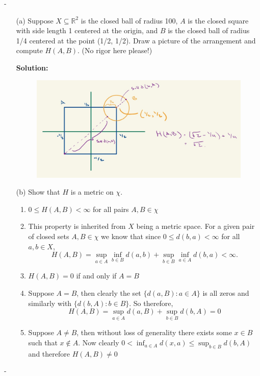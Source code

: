 \documentclass[12pt]{article}
\makeatletter
\theoremstyle{ex215}
\newcounter{probcount}
\newlength\probsep
\newlength\pshrinking
\newenvironment{problems}%
  {\ifhmode\unskip\par\fi\setcounter{probcount}{0}\probsep\parskip
  \sbox\@tempboxa{\textbf{9.}}\pshrinking\wd\@tempboxa\advance\pshrinking\labelsep
  \advance\linewidth -\pshrinking
  \advance\@totalleftmargin\pshrinking
  \advance\leftskip\pshrinking}%
  {\ifhmode\unskip \par\fi\advance\leftskip-\pshrinking}%
\newcommand{\localhead}[1]{\par\smallskip\textbf{#1}\nobreak\\}%
\newcommand\solution{\localhead{Solution:}}
\renewenvironment{proof}[1][\proofname]{\par
  \pushQED{\qed}%
  \normalfont \topsep6\p@\@plus6\p@\relax
  \trivlist
  \@topsep \topsep
  \item[\hskip\labelsep
        \itshape
    #1\@addpunct{.}]\ignorespaces
}{%
  \popQED\endtrivlist\@endpefalse
}
\newcommand{\Reals}{\ensuremath{\mathbb R}}
\let\RR\Reals
\makeatother
\begin{document}
\begin{problems}
\begin{enumerate}
  \item[(a)] Suppose $X \subseteq \RR^2$ is the closed ball of radius 100, $A$ is the closed square with side length 1 centered at the origin, and $B$ is the closed ball of radius 1/4 centered at the point (1/2, 1/2). Draw a picture of the arrangement and compute $H(A, B)$. (No rigor here please!)
  \solution
  \begin{figure}[H]
		\begin{center}
			\includegraphics[width=.75\textwidth]{Hauss.jpg}
		\end{center}
	\end{figure}
  

  \item[(b)] Show that $H$ is a metric on $\chi$. 
  \begin{enumerate}
    \item $0 \leq H(A,B) < \infty$ for all pairs $A, B \in \chi$
    \begin{proof} This property is inherited from $X$ being a metric space. For a given pair of closed sets $A, B \in \chi$ we know that since $0 \leq d(b, a) < \infty$ for all $a, b \in X$,
      \begin{equation*}
        H(A, B) = \sup_{a \in A}\inf_{b \in B}d(a, b) + \sup_{b \in B}\inf_{a \in A}d(b, a) < \infty. 
      \end{equation*} 
    \end{proof}

    \item $H(A,B) = 0$ if and only if $A = B$
    \begin{proof} Suppose $A = B$, then clearly the set $\{d(a, B): a \in A\}$ is all zeros and similarly 
      with $\{d(b, A): b \in B\}$. So therefore,
      \begin{equation*}
        H(A, B) = \sup_{a \in A}d(a, B) + \sup_{b \in B}d(b, A) = 0
      \end{equation*}
    \end{proof}
    \begin{proof} Suppose $A \neq B$, then without loss of generality there exists some $x \in B$ such that $x \not\in A$. Now clearly $0 < \inf_{a \in A}d(x, a) \leq \sup_{b \in B}d(b, A)$ and therefore $H(A,B) \neq 0$
    \end{proof}


\end{enumerate}
\end{enumerate}
\end{problems}
\end{document}

